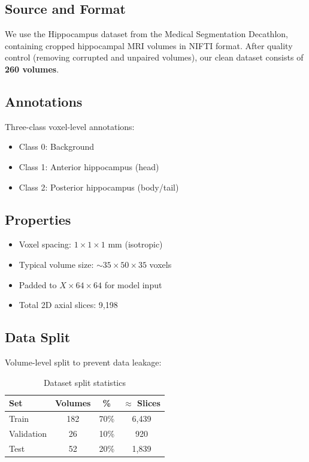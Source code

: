 \documentclass[12pt,a4paper,twocolumn]{article}
\begin{document}
\subsection{Source and Format}
We use the Hippocampus dataset from the Medical Segmentation Decathlon, containing cropped hippocampal MRI volumes in NIFTI format. After quality control (removing corrupted and unpaired volumes), our clean dataset consists of \textbf{260 volumes}.

\subsection{Annotations}
Three-class voxel-level annotations:
\begin{itemize}[nosep]
    \item Class 0: Background
    \item Class 1: Anterior hippocampus (head)
    \item Class 2: Posterior hippocampus (body/tail)
\end{itemize}

\subsection{Properties}
\begin{itemize}[nosep]
    \item Voxel spacing: $1 \times 1 \times 1$ mm (isotropic)
    \item Typical volume size: $\sim35 \times 50 \times 35$ voxels
    \item Padded to $X \times 64 \times 64$ for model input
    \item Total 2D axial slices: 9,198
\end{itemize}

\subsection{Data Split}
Volume-level split to prevent data leakage:

\begin{table}[H]
\centering
\small
\begin{tabular}{lccc}
\toprule
\textbf{Set} & \textbf{Volumes} & \textbf{\%} & \textbf{$\approx$ Slices} \\
\midrule
Train & 182 & 70\% & 6,439 \\
Validation & 26 & 10\% & 920 \\
Test & 52 & 20\% & 1,839 \\
\bottomrule
\end{tabular}
\caption{Dataset split statistics}
\end{table}
\end{document}
